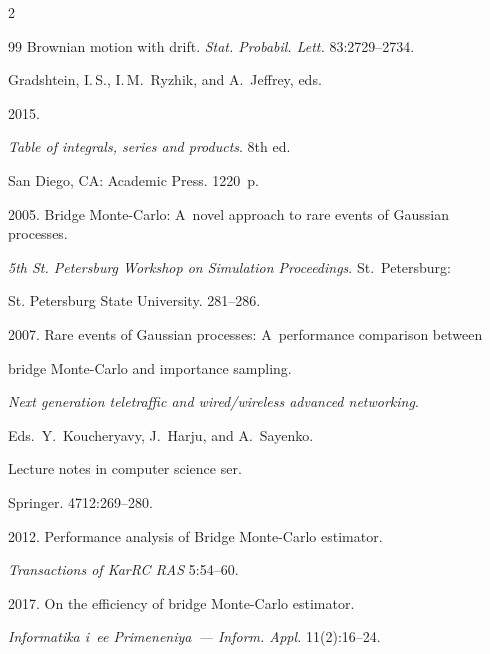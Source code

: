 \begin{multicols}{2}
{{\begin{thebibliography}{99}
Brownian motion with drift.  \textit{Stat. Probabil. Lett.} 83:2729--2734.


Gradshtein, I.\,S., I.\,M.~Ryzhik, and A.~Jeffrey, eds.


2015. 

\textit{Table of integrals, series and products}. 8th ed. 

San Diego, CA: Academic Press. 1220~p.



 2005. Bridge Monte-Carlo: A~novel approach to rare events of Gaussian processes. 

 \textit{5th St. Petersburg Workshop on Simulation Proceedings}. St.\ Petersburg: 

 St. Petersburg State University. 281--286.



 2007. Rare events of Gaussian processes: A~performance comparison between 

 bridge Monte-Carlo and importance sampling. 

 \textit{Next generation teletraffic and wired/wireless advanced networking}.

 Eds.\ Y.~Koucheryavy, J.~Harju, and A.~Sayenko.

 Lecture notes in computer science ser.

 Springer. 4712:269--280.



2012. Performance analysis of Bridge Monte-Carlo estimator. 

\textit{Transactions of KarRC RAS} 5:54--60.



 2017. On the efficiency of bridge Monte-Carlo estimator.  

 \textit{Informatika i~ee Primeneniya~--- Inform.  Appl.} 11(2):16--24.

 



\end{thebibliography}}}
\end{multicols}
